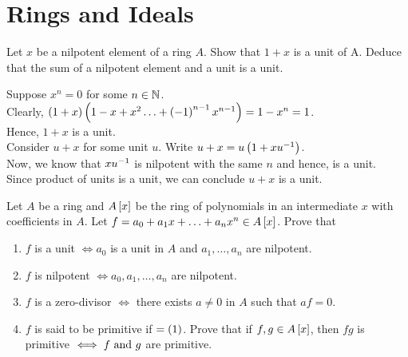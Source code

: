 \chapter{Rings and Ideals} \label{ch:rings-and-ideals}

\begin{exercise}{}{}
	Let \( x \) be a nilpotent element of a ring \( A \).
	Show that \( 1 + x \) is a unit of A\@.
	Deduce that the sum of a nilpotent element and a unit is a unit.
\end{exercise}

Suppose \( x^n = 0 \) for some \( n \in \NN \). \\
Clearly, \( \left( 1 + x \right)\left( 1 - x + x^2 \ldots + \left( -1 \right)^{n-1} x^{n-1} \right)
= 1 - x^n = 1 \). \\
Hence, \( 1 + x \) is a unit. \\
Consider \( u + x \) for some unit \( u \).
Write \( u + x = u \left( 1 + xu^{-1} \right) \). \\
Now, we know that \( xu^{-1} \) is nilpotent with the same \( n \)
and hence,  is a unit. \\
Since product of units is a unit, we can conclude \( u + x \)
is a unit.



\begin{exercise}{}{}
	Let \( A \) be a ring and \( A\left[ x \right] \) be the ring of
	polynomials in an intermediate \( x \) with coefficients in \( A \).
	Let \( f = a_0 + a_1 x + \ldots + a_n x^n \in A\left[ x \right] \).
	Prove that
	\begin{enumerate}
		\item \( f \) is a unit \( \iff a_0 \) is a unit in \( A \) and
			\( a_1, \ldots, a_n \) are nilpotent.
		\item \( f \) is nilpotent \( \iff a_0, a_1, \ldots, a_n \)
			are nilpotent.
		\item \( f \) is a zero-divisor \( \iff \) there exists \( a \neq 0 \)
			 in \( A \) such that \( af = 0 \).
		\item \( f \) is said to be primitive if 
			\( = \left( 1 \right) \).
			Prove that if \( f, g \in A\left[ x \right] \), then
			\( fg \) is primitive \( \iff f \text{ and } g \) are primitive.
	\end{enumerate}
\end{exercise}

